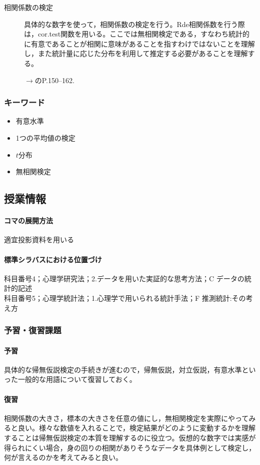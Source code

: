 \begin{description}

\item[相関係数の検定]具体的な数字を使って，相関係数の検定を行う。Rde相関係数を行う際は，cor.test関数を用いる。ここでは無相関検定である，すなわち統計的に有意であることが相関に意味があることを指すわけではないことを理解し，また統計量に応じた分布を利用して推定する必要があることを理解する。
\begin{flushright}
    $\to$\citet{清水2021}のP.150--162.
\end{flushright}

\end{description}
\subsubsection{キーワード}
\begin{itemize}
\item 有意水準
\item 1つの平均値の検定
\item $t$分布
\item 無相関検定
\end{itemize}
\subsection{授業情報}
\paragraph{コマの展開方法}
適宜投影資料を用いる
\paragraph{標準シラバスにおける位置づけ}
科目番号4；心理学研究法；2.データを用いた実証的な思考方法；C データの統計的記述\\
科目番号5；心理学統計法；1.心理学で用いられる統計手法；F 推測統計:その考え方
\subsubsection{予習・復習課題}
\paragraph{予習}
具体的な帰無仮説検定の手続きが進むので，帰無仮説，対立仮説，有意水準といった一般的な用語について復習しておく。
\paragraph{復習}
相関係数の大きさ，標本の大きさを任意の値にし，無相関検定を実際にやってみると良い。様々な数値を入れることで，検定結果がどのように変動するかを理解することは帰無仮説検定の本質を理解するのに役立つ。仮想的な数字では実感が得られにくい場合，身の回りの相関がありそうなデータを具体例として検定し，何が言えるのかを考えてみると良い。